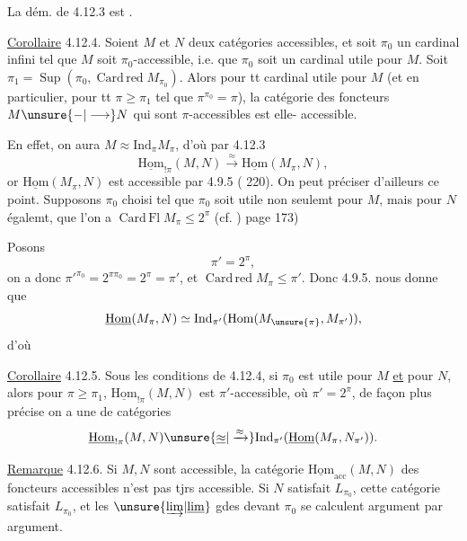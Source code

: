 La dém. de 4.12.3 est .

\uline{Corollaire} 4.12.4. Soient $M$ et $N$ deux
catégories accessibles, et soit $\pi_0$ un cardinal
infini tel que $M$ soit $\pi_0$-accessible, i.e.
que $\pi_0$ soit un cardinal utile pour $M$.
Soit $\pi_1=\operatorname{Sup}(\pi_0,\operatorname{Card\,red}M_{\pi_0})$. Alors
pour tt cardinal  utile pour $M$
(et en particulier, pour tt $\pi\geq\pi_1$ tel
que $\pi^{\pi_0}=\pi$), la catégorie des foncteurs
$M\unsure{-|\longrightarrow}N$ qui sont $\pi$-accessibles est
elle-\unsure{$=$} accessible.

En effet, on aura $M\approx\mathrm{Ind}_\pi M_\pi$,
d'où par 4.12.3
\[
 \underline{\mathrm{Hom}}_{!\pi}(M,N)\xrightarrow{\approx}\underline{\mathrm{Hom}}(M_\pi,N),
\]
or $\underline{\mathrm{Hom}}(M_\pi,N)$ est accessible par
4.9.5 ( 220). On peut préciser
d'ailleurs ce point. Supposons $\pi_0$ choisi
tel que $\pi_0$ soit utile non seulemt pour
$M$, mais pour $N$ égalemt, 
que l'on a $\operatorname{Card\,Fl} M_\pi\leq 2^\pi$ (cf. )
page 173)

Posons 
\[
 \pi'=2^\pi,
\]
on a donc ${\pi'}^{\pi_0}=2^{\pi\pi_0}=2^\pi=\pi'$, et 
$\operatorname{Card\,red}M_\pi\leq\pi'$. Donc 4.9.5. nous donne
que
\[
 \underline{\mathrm{Hom}}(M_\pi,N)\simeq\mathrm{Ind}_{\pi'}(\mathrm{Hom}(M_{\unsure{\pi}},M_{\pi'})),
\]
d'où

\uline{Corollaire} 4.12.5. Sous les conditions de
4.12.4, si $\pi_0$ est utile pour $M$ \uline{et}
pour $N$, alors pour $\pi\geq\pi_1$, 
$\underline{\mathrm{Hom}}_{!\pi}(M,N)$ est $\pi'$-accessible, où $\pi'=2^\pi$,
de façon plus précise on a une
 de catégories
\[
 \underline{\mathrm{Hom}}_{!\pi}(M,N)\unsure{\underline{\approx}|\xrightarrow{\approx}}
 \mathrm{Ind}_{\pi'}(\underline{\mathrm{Hom}}(M_\pi,N_{\pi'})).
\]

\uline{Remarque} 4.12.6. Si  $M,N$ sont accessible,
la catégorie $\underline{\mathrm{Hom}}_{\mathrm{acc}}(M,N)$ des foncteurs
accessibles n'est pas  tjrs accessible.
Si $N$ satisfait $L_{\pi_0}$, cette catégorie
satisfait $L_{\pi_0}$, et les $\unsure{\underrightarrow{\lim}|\underline{\lim}}$ gdes devant
$\pi_0$ se calculent argument par argument.


